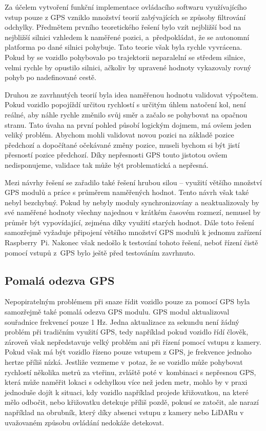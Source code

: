 \documentclass[czech, bachelor]{diploma}
\begin{document}
Za účelem vytvoření funkční implementace ovládacího softwaru využívajícího vstup pouze z GPS vzniklo množství teorií zabývajících
se způsoby filtrování odchylky. Předmětem prvního teoretického řešení bylo vzít nejbližší bod na nejbližší silnici vzhledem
k naměřené pozici, a~předpokládat, že se autonomní platforma po dané silnici pohybuje. Tato teorie však byla rychle vyvrácena.
Pokud by se vozidlo pohybovalo po trajektorii neparalelní se středem silnice, velmi rychle by opustilo silnici, ačkoliv by
upravené hodnoty vykazovaly rovný pohyb po nadefinované cestě.

Druhou ze zavrhnutých teorií byla idea naměřenou hodnotu validovat výpočtem. Pokud vozidlo popojíždí určitou rychlostí s určitým
úhlem natočení kol, není reálné, aby náhle rychle změnilo svůj směr a začalo se pohybovat na opačnou stranu. Tato úvaha na první
pohled působí logickým dojmem, má ovšem jeden veliký problém. Abychom mohli validovat novou pozici na základě pozice předchozí
a dopočítané očekávané změny pozice, museli bychom si být jistí přesností pozice předchozí. Díky nepřesnosti GPS touto jistotou
ovšem nedisponujeme, validace tak může být problematická a nepřesná.

Mezi návrhy řešení se zařadilo také řešení hrubou silou -- využití většího množství GPS modulů a práce s průměrem naměřených
hodnot. Tento návrh však také nebyl bezchybný. Pokud by nebyly moduly synchronizovány a neaktualizovaly by své naměřené hodnoty
všechny najednou v krátkém časovém rozmezí, nemusel by průměr být vypovídající, zejména díky využití starých hodnot. Dále toto
řešení samozřejmě vyžaduje připojení většího množství GPS modulů k jednomu zařízení Raspberry~Pi. Nakonec však nedošlo k testování
tohoto řešení, neboť řízení čistě pomocí vstupů z~GPS bylo ještě před testováním zavrhnuto.

\subsection{Pomalá odezva GPS} \label{gps-low-polling-rate}

Nepopiratelným problémem při snaze řídit vozidlo pouze za pomocí GPS byla samozřejmě také pomalá odezva GPS modulu. GPS modul
aktualizoval souřadnice frekvencí pouze 1 Hz. Jedna aktualizace za sekundu není žádný problém při tradičním využití GPS, tedy
například pokud vozidlo řídí člověk, zároveň však nepředstavuje velký problém ani při řízení pomocí vstupu z kamery. Pokud však
má být vozidlo řízeno pouze vstupem z GPS, je frekvence jednoho hertze příliš nízká. Jestliže vezmeme v~potaz, že se vozidlo může
pohybovat rychlostí několika metrů za vteřinu, zvláště poté v~kombinaci s nepřesnou GPS, která může naměřit lokaci s odchylkou
více než jeden metr, mohlo by v praxi jednoduše dojít k situaci, kdy vozidlo například projede křižovatkou, na které mělo odbočit,
nebo křižovatku detekuje příliš pozdě, pokusí se zatočit, ale narazí například na obrubník, který díky absenci vstupu z kamery
nebo LiDARu v uvažovaném způsobu ovládání nedokáže detekovat.
\end{document}
